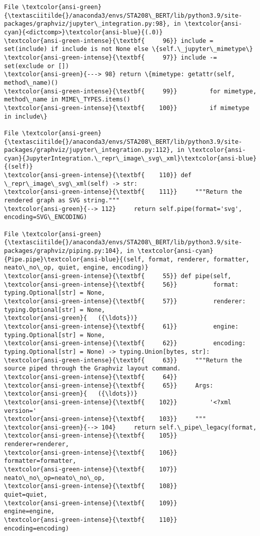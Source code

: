 \documentclass[11pt]{article}
\begin{document}
\begin{Verbatim}[commandchars=\\\{\}, frame=single, framerule=2mm, rulecolor=\color{outerrorbackground}]
File \textcolor{ansi-green}{\textasciitilde{}/anaconda3/envs/STA208\_BERT/lib/python3.9/site-packages/graphviz/jupyter\_integration.py:98}, in \textcolor{ansi-cyan}{<dictcomp>}\textcolor{ansi-blue}{(.0)}
\textcolor{ansi-green-intense}{\textbf{     96}} include = set(include) if include is not None else \{self.\_jupyter\_mimetype\}
\textcolor{ansi-green-intense}{\textbf{     97}} include -= set(exclude or [])
\textcolor{ansi-green}{---> 98} return \{mimetype: getattr(self, method\_name)()
\textcolor{ansi-green-intense}{\textbf{     99}}         for mimetype, method\_name in MIME\_TYPES.items()
\textcolor{ansi-green-intense}{\textbf{    100}}         if mimetype in include\}

File \textcolor{ansi-green}{\textasciitilde{}/anaconda3/envs/STA208\_BERT/lib/python3.9/site-packages/graphviz/jupyter\_integration.py:112}, in \textcolor{ansi-cyan}{JupyterIntegration.\_repr\_image\_svg\_xml}\textcolor{ansi-blue}{(self)}
\textcolor{ansi-green-intense}{\textbf{    110}} def \_repr\_image\_svg\_xml(self) -> str:
\textcolor{ansi-green-intense}{\textbf{    111}}     """Return the rendered graph as SVG string."""
\textcolor{ansi-green}{--> 112}     return self.pipe(format='svg', encoding=SVG\_ENCODING)

File \textcolor{ansi-green}{\textasciitilde{}/anaconda3/envs/STA208\_BERT/lib/python3.9/site-packages/graphviz/piping.py:104}, in \textcolor{ansi-cyan}{Pipe.pipe}\textcolor{ansi-blue}{(self, format, renderer, formatter, neato\_no\_op, quiet, engine, encoding)}
\textcolor{ansi-green-intense}{\textbf{     55}} def pipe(self,
\textcolor{ansi-green-intense}{\textbf{     56}}          format: typing.Optional[str] = None,
\textcolor{ansi-green-intense}{\textbf{     57}}          renderer: typing.Optional[str] = None,
\textcolor{ansi-green}{   ({\ldots})}
\textcolor{ansi-green-intense}{\textbf{     61}}          engine: typing.Optional[str] = None,
\textcolor{ansi-green-intense}{\textbf{     62}}          encoding: typing.Optional[str] = None) -> typing.Union[bytes, str]:
\textcolor{ansi-green-intense}{\textbf{     63}}     """Return the source piped through the Graphviz layout command.
\textcolor{ansi-green-intense}{\textbf{     64}} 
\textcolor{ansi-green-intense}{\textbf{     65}}     Args:
\textcolor{ansi-green}{   ({\ldots})}
\textcolor{ansi-green-intense}{\textbf{    102}}         '<?xml version='
\textcolor{ansi-green-intense}{\textbf{    103}}     """
\textcolor{ansi-green}{--> 104}     return self.\_pipe\_legacy(format,
\textcolor{ansi-green-intense}{\textbf{    105}}                              renderer=renderer,
\textcolor{ansi-green-intense}{\textbf{    106}}                              formatter=formatter,
\textcolor{ansi-green-intense}{\textbf{    107}}                              neato\_no\_op=neato\_no\_op,
\textcolor{ansi-green-intense}{\textbf{    108}}                              quiet=quiet,
\textcolor{ansi-green-intense}{\textbf{    109}}                              engine=engine,
\textcolor{ansi-green-intense}{\textbf{    110}}                              encoding=encoding)


\end{Verbatim}
\end{document}
